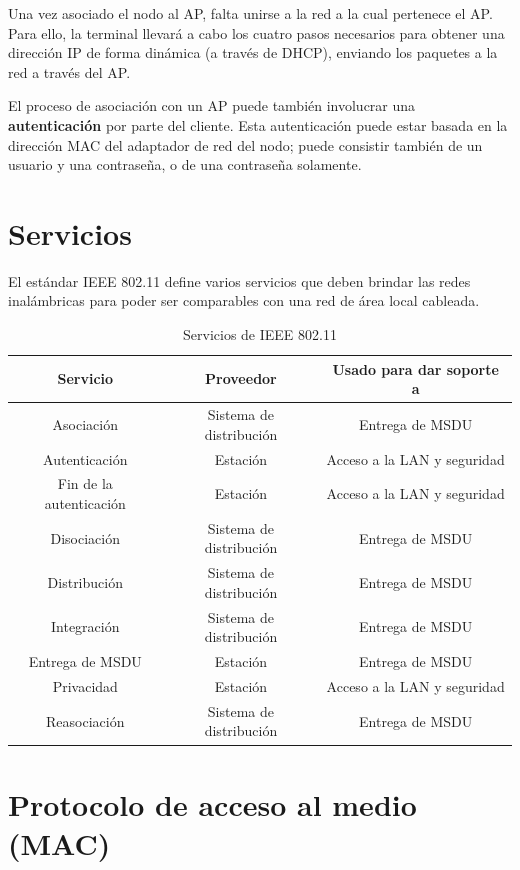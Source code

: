 Una vez asociado el nodo al AP, falta unirse a la red a la cual pertenece el AP. Para ello, la terminal llevará a cabo los cuatro pasos necesarios para obtener una dirección IP de forma dinámica (a través de DHCP), enviando los paquetes a la red a través del AP.

El proceso de asociación con un AP puede también involucrar una \textbf{autenticación} por parte del cliente. Esta autenticación puede estar basada en la dirección MAC del adaptador de red del nodo; puede consistir también de un usuario y una contraseña, o de una contraseña solamente.

\section{Servicios}

El estándar IEEE 802.11 define varios servicios que deben brindar las redes inalámbricas para poder ser comparables con una red de área local cableada.

\begin{table}[h!]
\centering
\begin{tabular}{| c | c | c |}
\hline
\textbf{Servicio} & \textbf{Proveedor} & \textbf{Usado para dar soporte a} \\ \hline
\hline
Asociación & Sistema de distribución & Entrega de MSDU \\ \hline
Autenticación & Estación & Acceso a la LAN y seguridad \\ \hline
Fin de la autenticación & Estación & Acceso a la LAN y seguridad \\ \hline
Disociación & Sistema de distribución & Entrega de MSDU \\ \hline
Distribución & Sistema de distribución & Entrega de MSDU \\ \hline
Integración & Sistema de distribución & Entrega de MSDU \\ \hline
Entrega de MSDU & Estación & Entrega de MSDU \\ \hline
Privacidad & Estación & Acceso a la LAN y seguridad \\ \hline
Reasociación & Sistema de distribución & Entrega de MSDU \\ \hline
\end{tabular}
\caption{Servicios de IEEE 802.11 \autocite{Stallings:Wireless:SeptimaEd}}
\end{table}


\section{Protocolo de acceso al medio (MAC)}

